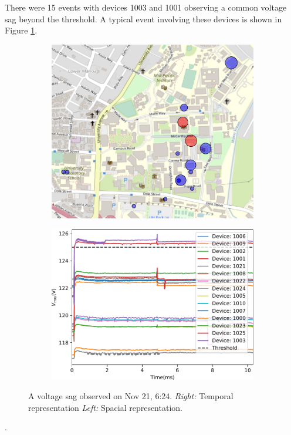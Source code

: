There were 15 events with devices 1003 and 1001 observing a common voltage sag beyond the threshold.
A typical event involving these devices is shown in Figure \ref{fig:expdes:sub:ev5}.

\begin{figure}[ht!]
    \centering
    \begin{subfigure}{0.49\textwidth}
        \centering
        \includegraphics[width=1\linewidth]{img/napali_eval/subthreshold/clustering/315639.pdf}
    \end{subfigure}%
    \begin{subfigure}{0.49\textwidth}
        \centering
        \includegraphics[width=1\linewidth]{img/napali_eval/subthreshold/clustering/315639_data.pdf}
    \end{subfigure}
    \caption{
    A voltage sag observed on Nov 21, 6:24.
    \textit{Right:} Temporal representation
    \textit{Left:} Spacial representation.
    }
    \label{fig:expdes:sub:ev5}
\end{figure}.

